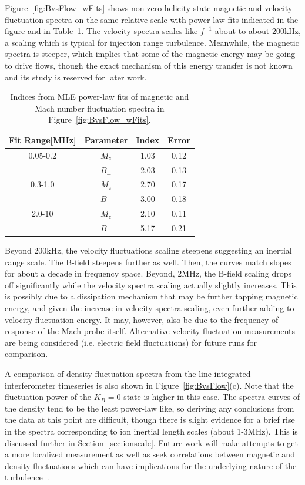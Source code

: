 \documentclass[aip,prl,amsmath,amssymb,reprint,superscriptaddress]{revtex4-1} %
\begin{document}
Figure~\ref{fig:BvsFlow_wFits} shows non-zero helicity state magnetic and velocity fluctuation spectra on the same relative scale with power-law fits indicated in the figure and in Table~\ref{tab:BMindices}. The velocity spectra scales like $f^{-1}$ about to about 200kHz, a scaling which is typical for injection range turbulence. Meanwhile, the magnetic spectra is steeper, which implies that some of the magnetic energy may be going to drive flows, though the exact mechanism of this energy transfer is not known and its study is reserved for later work.

\begin{table}
\caption{\label{tab:BMindices}Indices from MLE power-law fits of magnetic and Mach number fluctuation spectra in Figure~\ref{fig:BvsFlow_wFits}.}
\begin{tabular}{cccc}
\toprule
Fit Range[MHz]	&	Parameter		&	Index	&Error\\
\hline
0.05-0.2				& $M_{z}$			& 1.03	&0.12\\
								& $B_{\perp}$	& 2.03  &0.13\\
\hline
0.3-1.0					& $M_{z}$			& 2.70	&0.17\\
								& $B_{\perp}$	& 3.00  &0.18\\
\hline
2.0-10					& $M_{z}$			& 2.10	&0.11\\
								& $B_{\perp}$	& 5.17  &0.21\\
\hline
\end{tabular}
\end{table}

Beyond 200kHz, the velocity fluctuations scaling steepens suggesting an inertial range scale. The B-field steepens further as well. Then, the curves match slopes for about a decade in frequency space. Beyond, 2MHz, the B-field scaling drops off significantly while the velocity spectra scaling actually slightly increases. This is possibly due to a dissipation mechanism that may be further tapping magnetic energy, and given the increase in velocity spectra scaling, even further adding to velocity fluctuation energy. It may, however, also be due to the frequency of response of the Mach probe itself. Alternative velocity fluctuation measurements are being considered (i.e. electric field fluctuations) for future runs for comparison.

A comparison of density fluctuation spectra from the line-integrated interferometer timeseries is also shown in Figure~\ref{fig:BvsFlow}(c). Note that the fluctuation power of the $K_{B}=0$ state is higher in this case. The spectra curves of the density tend to be the least power-law like, so deriving any conclusions from the data at this point are difficult, though there is slight evidence for a brief rise in the spectra corresponding to ion inertial length scales (about 1-3MHz). This is discussed further in Section~\ref{sec:ionscale}. Future work will make attempts to get a more localized measurement as well as seek correlations between magnetic and density fluctuations which can have implications for the underlying nature of the turbulence~\cite{klein12}.
\end{document}
